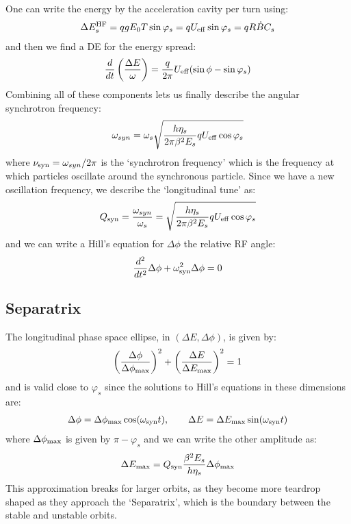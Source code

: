\documentclass{article}
\numberwithin{equation}{section}
\begin{document}
One can write the energy by the acceleration cavity per turn using:
\begin{align}
\Delta E_s^{\rm HF} = q g E_0 T \sin \varphi_s = q U_{\rm eff} \sin \varphi_s = q R \dot{B} C_s
\end{align}
and then we find a DE for the energy spread:
\begin{align}
\frac{d}{dt} \left( \frac{\Delta E}{\omega } \right) = \frac{q}{2 \pi }U_{\rm eff} (\sin \phi - \sin \varphi_s)
\end{align}
Combining all of these components lets us finally describe the angular synchrotron frequency:
\begin{align}
\omega_{syn} = \omega_s \sqrt{ \frac{h \eta_s}{2 \pi \beta^2 E_s} q U_{\rm eff} \cos \varphi_s }
\end{align}
where $\nu_{\rm syn} = \omega_{syn}/2\pi$ is the `synchrotron frequency' which is the frequency at which particles oscillate around the synchronous particle.
Since we have a new oscillation frequency, we describe the `longitudinal tune' as:
\begin{align}
Q_{\rm syn} = \frac{\omega_{syn}}{\omega_s} =  \sqrt{ \frac{h \eta_s}{2 \pi \beta^2 E_s} q U_{\rm eff} \cos \varphi_s }
\end{align}
and we can write a Hill's equation for $\Delta \phi$ the relative RF angle:
\begin{align}
\frac{d^2}{dt^2}\Delta \phi + \omega_{\rm syn}^2 \Delta \phi = 0
\end{align}

\subsection{ Separatrix }
The longitudinal phase space ellipse, in $(\Delta E, \Delta \phi)$, is given by:
\begin{align}
\left( \frac{\Delta \phi}{\Delta \phi_{\rm max}} \right)^2 + \left( \frac{\Delta E}{\Delta E_{\rm max}} \right)^2 = 1
\end{align}
and is valid close to $\varphi_s$ since the solutions to Hill's equations in these dimensions are:
\begin{align}
\Delta \phi = \Delta \phi_{\rm max} \cos (\omega_{\rm syn } t) , \qquad
\Delta E = \Delta E_{\rm max} \sin (\omega_{\rm syn } t)
\end{align}
where $ \Delta \phi_{\rm max}$ is given by $\pi - \varphi_s$ and we can write the other amplitude as: 
\begin{align}
\Delta E_{\rm max} = Q_{\rm syn} \frac{\beta^2 E_s}{h \eta_s} \Delta \phi_{\rm max}
\end{align}
This approximation breaks for larger orbits, as they become more teardrop shaped as they approach the `Separatrix', which is the boundary between the stable and unstable orbits. 
\end{document}
